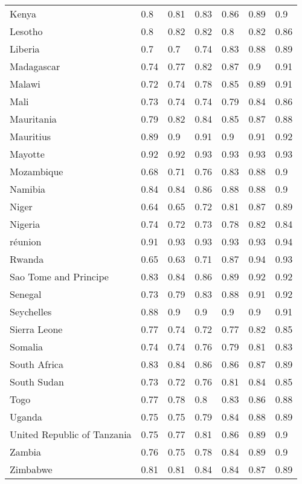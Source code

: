\begin{longtable}[t]{lllllll}
Kenya & 0.8 & 0.81 & 0.83 & 0.86 & 0.89 & 0.9\\
Lesotho & 0.8 & 0.82 & 0.82 & 0.8 & 0.82 & 0.86\\
Liberia & 0.7 & 0.7 & 0.74 & 0.83 & 0.88 & 0.89\\
Madagascar & 0.74 & 0.77 & 0.82 & 0.87 & 0.9 & 0.91\\
Malawi & 0.72 & 0.74 & 0.78 & 0.85 & 0.89 & 0.91\\
Mali & 0.73 & 0.74 & 0.74 & 0.79 & 0.84 & 0.86\\
Mauritania & 0.79 & 0.82 & 0.84 & 0.85 & 0.87 & 0.88\\
Mauritius & 0.89 & 0.9 & 0.91 & 0.9 & 0.91 & 0.92\\
Mayotte & 0.92 & 0.92 & 0.93 & 0.93 & 0.93 & 0.93\\
Mozambique & 0.68 & 0.71 & 0.76 & 0.83 & 0.88 & 0.9\\
Namibia & 0.84 & 0.84 & 0.86 & 0.88 & 0.88 & 0.9\\
Niger & 0.64 & 0.65 & 0.72 & 0.81 & 0.87 & 0.89\\
Nigeria & 0.74 & 0.72 & 0.73 & 0.78 & 0.82 & 0.84\\
réunion & 0.91 & 0.93 & 0.93 & 0.93 & 0.93 & 0.94\\
Rwanda & 0.65 & 0.63 & 0.71 & 0.87 & 0.94 & 0.93\\
Sao Tome and Principe & 0.83 & 0.84 & 0.86 & 0.89 & 0.92 & 0.92\\
Senegal & 0.73 & 0.79 & 0.83 & 0.88 & 0.91 & 0.92\\
Seychelles & 0.88 & 0.9 & 0.9 & 0.9 & 0.9 & 0.91\\
Sierra Leone & 0.77 & 0.74 & 0.72 & 0.77 & 0.82 & 0.85\\
Somalia & 0.74 & 0.74 & 0.76 & 0.79 & 0.81 & 0.83\\
South Africa & 0.83 & 0.84 & 0.86 & 0.86 & 0.87 & 0.89\\
South Sudan & 0.73 & 0.72 & 0.76 & 0.81 & 0.84 & 0.85\\
Togo & 0.77 & 0.78 & 0.8 & 0.83 & 0.86 & 0.88\\
Uganda & 0.75 & 0.75 & 0.79 & 0.84 & 0.88 & 0.89\\
United Republic of Tanzania & 0.75 & 0.77 & 0.81 & 0.86 & 0.89 & 0.9\\
Zambia & 0.76 & 0.75 & 0.78 & 0.84 & 0.89 & 0.9\\
Zimbabwe & 0.81 & 0.81 & 0.84 & 0.84 & 0.87 & 0.89\\*
\end{longtable}
\endgroup{}
